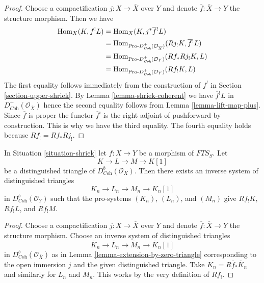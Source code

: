 \begin{proof}
Choose a compactification $j : X \to \overline{X}$ over $Y$ and
denote $\overline{f} : \overline{X} \to Y$ the structure morphism.
Then we have
\begin{align*}
\mathop{\mathrm{Hom}}\nolimits_X(K, f^!L)
& =
\mathop{\mathrm{Hom}}\nolimits_X(K, j^*\overline{f}{}^!L) \\
& =
\mathop{\mathrm{Hom}}\nolimits_{\text{Pro-}D^+_{\textit{Coh}}(\mathcal{O}_{\overline{X}})}
(Rj_!K, \overline{f}{}^!L) \\
& =
\mathop{\mathrm{Hom}}\nolimits_{\text{Pro-}D^+_{\textit{Coh}}(\mathcal{O}_Y)}(Rf_*Rj_!K, L) \\
& =
\mathop{\mathrm{Hom}}\nolimits_{\text{Pro-}D^+_{\textit{Coh}}(\mathcal{O}_Y)}(Rf_!K, L)
\end{align*}
The first equality follows immediately from the construction of $f^!$ in
Section \ref{section-upper-shriek}.
By Lemma \ref{lemma-shriek-coherent} we have $\overline{f}{}^!L$
in $D^+_{\textit{Coh}}(\mathcal{O}_{\overline{X}})$ hence the second
equality follows from Lemma \ref{lemma-lift-map-plus}.
Since $\overline{f}$ is proper the functor $\overline{f}{}^!$
is the right adjoint of pushforward by construction. This is
why we have the third equality.
The fourth equality holds because $Rf_! = Rf_* Rj_!$.
\end{proof}

\begin{lemma}
\label{lemma-compactly-supported-triangle}
In Situation \ref{situation-shriek} let $f : X \to Y$ be a morphism of
$\textit{FTS}_S$. Let
$$
K \to L \to M \to K[1]
$$
be a distinguished triangle of $D^b_{\textit{Coh}}(\mathcal{O}_X)$.
Then there exists an inverse system of distinguished triangles
$$
K_n \to L_n \to M_n \to K_n[1]
$$
in $D^b_{\textit{Coh}}(\mathcal{O}_Y)$ such that the pro-systems
$(K_n)$, $(L_n)$, and $(M_n)$ give $Rf_!K$, $Rf_!L$, and $Rf_!M$.
\end{lemma}

\begin{proof}
Choose a compactification $j : X \to \overline{X}$ over $Y$ and
denote $\overline{f} : \overline{X} \to Y$ the structure morphism.
Choose an inverse system of distinguished triangles
$$
\overline{K}_n \to \overline{L}_n \to \overline{M}_n \to \overline{K}_n[1]
$$
in $D^b_{\textit{Coh}}(\mathcal{O}_{\overline{X}})$ as in
Lemma \ref{lemma-extension-by-zero-triangle} corresponding to the
open immersion $j$ and the given distinguished triangle. Take
$K_n = R\overline{f}_*\overline{K}_n$
and similarly for $L_n$ and $M_n$. This works by the very definition
of $Rf_!$.
\end{proof}

